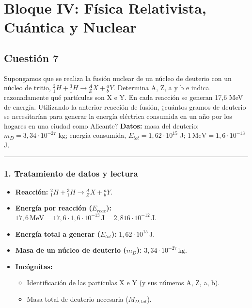 \section{Bloque IV: Física Relativista, Cuántica y Nuclear}
\label{sec:moderna_2024_jul_ext}
\subsection{Cuestión 7}
\label{subsec:C7_2024_jul_ext}

\begin{cajaenunciado}
Supongamos que se realiza la fusión nuclear de un núcleo de deuterio con un núcleo de tritio, ${}_{1}^{2}H + {}_{1}^{3}H\rightarrow{}_{Z}^{A}X+{}_{b}^{a}Y$. Determina A, Z, a y b e indica razonadamente qué partículas son X e Y. En cada reacción se generan 17,6 MeV de energía. Utilizando la anterior reacción de fusión, ¿cuántos gramos de deuterio se necesitarían para generar la energía eléctrica consumida en un año por los hogares en una ciudad como Alicante?
\textbf{Datos:} masa del deuterio: $m_{D}=3,34\cdot10^{-27}$ kg; energía consumida, $E_{tot}=1,62\cdot10^{15}$ J; $1 \, \text{MeV} = 1,6\cdot10^{-13}$ J.
\end{cajaenunciado}
\hrule

\subsubsection*{1. Tratamiento de datos y lectura}
\begin{itemize}
    \item \textbf{Reacción:} ${}_{1}^{2}H + {}_{1}^{3}H \rightarrow {}_{Z}^{A}X + {}_{b}^{a}Y$.
    \item \textbf{Energía por reacción ($E_{reac}$):} $17,6 \, \text{MeV} = 17,6 \cdot 1,6\cdot10^{-13} \, \text{J} = 2,816 \cdot 10^{-12} \, \text{J}$.
    \item \textbf{Energía total a generar ($E_{tot}$):} $1,62 \cdot 10^{15} \, \text{J}$.
    \item \textbf{Masa de un núcleo de deuterio ($m_D$):} $3,34 \cdot 10^{-27} \, \text{kg}$.
    \item \textbf{Incógnitas:}
    \begin{itemize}
        \item Identificación de las partículas X e Y (y sus números A, Z, a, b).
        \item Masa total de deuterio necesaria ($M_{D,tot}$).
    \end{itemize}
\end{itemize}

